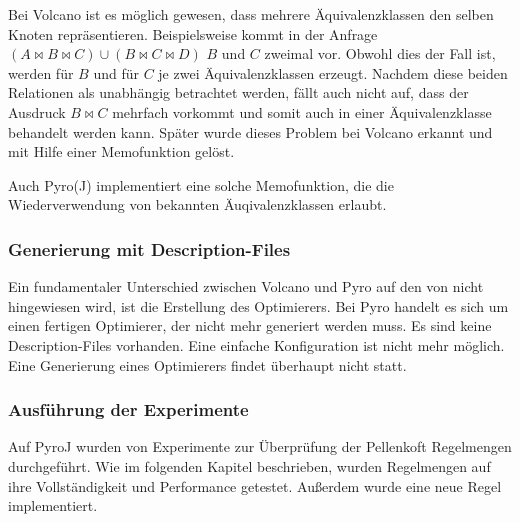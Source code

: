 Bei Volcano ist es möglich gewesen, dass mehrere Äquivalenzklassen den selben Knoten repräsentieren. Beispielsweise kommt in der Anfrage $(A \Join B \Join C) \cup (B \Join C \Join D)$ $B$ und $C$ zweimal vor. Obwohl dies der Fall ist, werden für $B$ und für $C$ je zwei Äquivalenzklassen erzeugt. Nachdem diese beiden Relationen als unabhängig betrachtet werden, fällt auch nicht auf, dass der Ausdruck $B \Join C$ mehrfach vorkommt und somit auch in einer Äquivalenzklasse behandelt werden kann. Später wurde dieses Problem bei Volcano erkannt und mit Hilfe einer Memofunktion gelöst.

Auch Pyro(J) implementiert eine solche Memofunktion, die die Wiederverwendung von bekannten Äuqivalenzklassen erlaubt.


\subsubsection{Generierung mit Description-Files}

Ein fundamentaler Unterschied zwischen Volcano und Pyro auf den von \cite{roy2001multi} nicht hingewiesen wird, ist die Erstellung des Optimierers. Bei Pyro handelt es sich um einen fertigen Optimierer, der nicht mehr generiert werden muss. Es sind keine Description-Files vorhanden. Eine einfache Konfiguration ist nicht mehr möglich. Eine Generierung eines Optimierers findet überhaupt nicht statt.


\subsubsection{Ausführung der Experimente}

Auf PyroJ wurden von \cite{shanbhag2014optimizing} Experimente zur Überprüfung der Pellenkoft Regelmengen durchgeführt. Wie im folgenden Kapitel beschrieben, wurden Regelmengen auf ihre Vollständigkeit und Performance getestet. Außerdem wurde eine neue Regel implementiert. 
